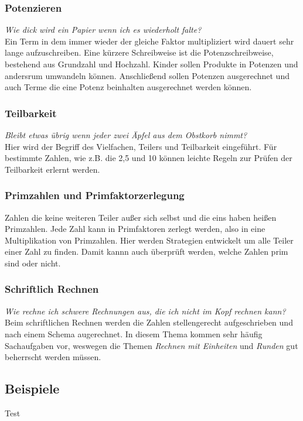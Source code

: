 \documentclass{article}
\begin{document}
\subsubsection*{Potenzieren}
\textit{Wie dick wird ein Papier wenn ich es wiederholt falte?}\\
Ein Term in dem immer wieder der gleiche Faktor multipliziert wird dauert sehr lange aufzuschreiben. Eine kürzere Schreibweise ist die Potenzschreibweise, bestehend aus Grundzahl und Hochzahl. Kinder sollen Produkte in Potenzen und andersrum umwandeln können. Anschließend sollen Potenzen ausgerechnet und auch Terme die eine Potenz beinhalten ausgerechnet werden können.
\subsubsection*{Teilbarkeit}
\textit{Bleibt etwas übrig wenn jeder zwei Äpfel aus dem Obstkorb nimmt?}\\
Hier wird der Begriff des Vielfachen, Teilers und Teilbarkeit eingeführt. Für bestimmte Zahlen, wie z.B. die 2,5 und 10 können leichte Regeln zur Prüfen der Teilbarkeit erlernt werden.
\subsubsection*{Primzahlen und Primfaktorzerlegung}
Zahlen die keine weiteren Teiler außer sich selbst und die eins haben heißen Primzahlen. Jede Zahl kann in Primfaktoren zerlegt werden, also in eine Multiplikation von Primzahlen. Hier werden Strategien entwickelt um alle Teiler einer Zahl zu finden. Damit kannn auch überprüft werden, welche Zahlen prim sind oder nicht.
\subsubsection*{Schriftlich Rechnen}
\textit{Wie rechne ich schwere Rechnungen aus, die ich nicht im Kopf rechnen kann?}\\
Beim schriftlichen Rechnen werden die Zahlen stellengerecht aufgeschrieben und nach einem Schema augerechnet. In diesem Thema kommen sehr häufig Sachaufgaben vor, weswegen die Themen \textit{Rechnen mit Einheiten} und \textit{Runden} gut beherrscht werden müssen.
\subsection{Beispiele}
\begin{tcolorbox}[colback=gray!5!white,colframe=gray!25!black]
Test
\end{tcolorbox}
\end{document}
